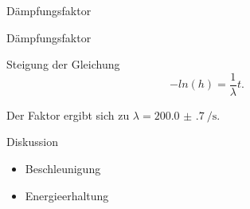 \begin{frame}[t]{Dämpfungsfaktor}
    \begin{block}{Dämpfungsfaktor}
    
        Steigung der Gleichung 
        \begin{equation}
            -ln(h) = \frac{1}{\lambda} t.
        \end{equation}

        Der Faktor ergibt sich zu $\lambda = \SI{200.0(7)}{\per\second}$.
    \end{block}
\end{frame}

\begin{frame}[t]{Diskussion}
    
    \begin{itemize}
        \item Beschleunigung\pause 
        \item Energieerhaltung
    \end{itemize}
\end{frame}
